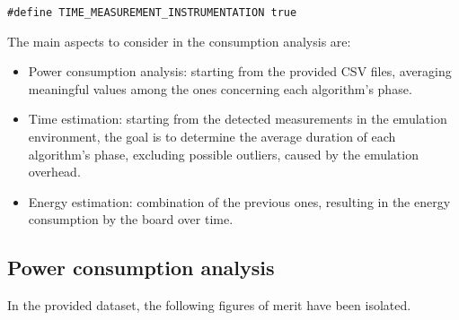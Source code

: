 \documentclass[a4paper,11pt]{article} %
\begin{document}
    \begin{verbatim}
#define TIME_MEASUREMENT_INSTRUMENTATION true
    \end{verbatim}

    The main aspects to consider in the consumption analysis are:
    \begin{itemize}
        \item Power consumption analysis: starting from the provided CSV files, averaging meaningful values among the ones concerning each algorithm's phase.
        \item Time estimation: starting from the detected measurements in the emulation environment, the goal is to determine the average duration of each algorithm's phase, excluding possible outliers, caused by the emulation overhead.
        \item Energy estimation: combination of the previous ones, resulting in the energy consumption by the board over time.
    \end{itemize}

    \subsection{Power consumption analysis}\label{subsec:power-consumption-analysis}

    In the provided dataset, the following figures of merit have been isolated.
\end{document}
